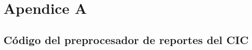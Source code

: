 \chapter{Apendice A}
\label{c\'{o}digo}

\section{C\'{o}digo del preprocesador de reportes del CIC}


\clearpage
